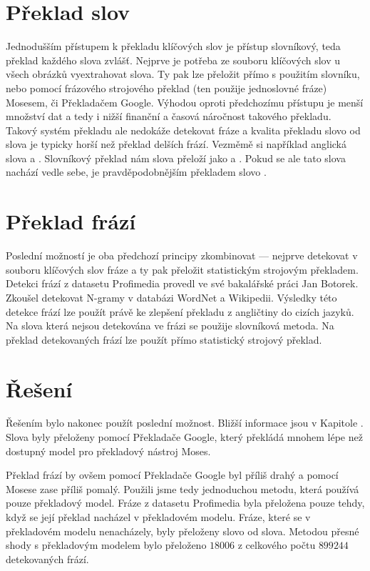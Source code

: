 \section{Překlad slov}

Jednodušším přístupem k překladu klíčových slov je přístup slovníkový, teda překlad každého slova zvlášť. Nejprve je potřeba ze souboru klíčových slov u všech obrázků vyextrahovat slova. Ty pak lze přeložit přímo s použitím slovníku, nebo pomocí frázového strojového překlad (ten použije jednoslovné fráze) Mosesem, či Překladačem Google. Výhodou oproti předchozímu přístupu je menší množství dat a tedy i nižší finanční a časová náročnost takového překladu. Takový systém překladu ale nedokáže detekovat fráze a kvalita překladu slovo od slova je typicky horší než překlad delších frází. Vezměmě si například anglická slova  a . Slovníkový překlad nám slova přeloží jako  a . Pokud se ale tato slova nachází vedle sebe, je pravděpodobnějším překladem slovo .

\section{Překlad frází}

Poslední možností je oba předchozí principy zkombinovat --- nejprve detekovat v souboru klíčových slov fráze a ty pak přeložit statistickým strojovým překladem. Detekci frází z datasetu Profimedia provedl ve své bakalářské práci\cite{botorek} Jan Botorek. Zkoušel detekovat N-gramy v databázi WordNet\cite{wordnet} a Wikipedii. Výsledky této detekce frází lze použít právě ke zlepšení překladu z angličtiny do cizích jazyků. Na slova která nejsou detekována ve frázi se použije slovníková metoda. Na překlad detekovaných frází lze použít přímo statistický strojový překlad.


\section{Řešení}

Řešením bylo nakonec použít poslední možnost. Bližší informace jsou v Kapitole \cite{chap:implementace}. Slova byly přeloženy pomocí Překladače Google, který překládá mnohem lépe než dostupný model pro překladový nástroj Moses.

Překlad frází by ovšem pomocí Překladače Google byl příliš drahý a pomocí Mosese zase příliš pomalý. Použili jsme tedy jednoduchou metodu, která používá pouze překladový model. Fráze z datasetu Profimedia byla přeložena pouze tehdy, když se její překlad nacházel v překladovém modelu. Fráze, které se v překladovém modelu nenacházely, byly přeloženy slovo od slova. Metodou přesné shody s překladovým modelem bylo přeloženo $18 006$ z celkového počtu $899 244$ detekovaných frází.

